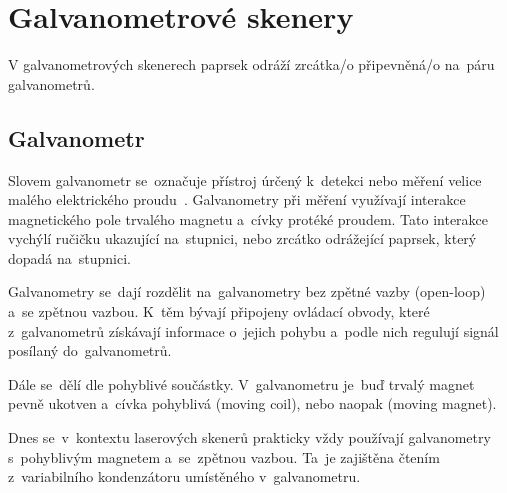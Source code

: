\section{Galvanometrové skenery}
V galvanometrových skenerech paprsek odráží zrcátka/o připevněná/o na~páru galvanometrů.

\subsection{Galvanometr}
Slovem galvanometr se~označuje přístroj úrčený k~detekci nebo měření velice malého elektrického proudu~\cite{galvo-definition}. Galvanometry při měření využívají interakce magnetického pole trvalého magnetu a~cívky protéké proudem. Tato interakce vychýlí ručičku ukazující na~stupnici, nebo zrcátko odrážející paprsek, který dopadá na~stupnici.~\cite{wiki-galvo}

Galvanometry se~dají rozdělit na~galvanometry bez zpětné vazby (open-loop) a~se zpětnou vazbou. K~těm bývají připojeny ovládací obvody, které z~galvanometrů získávají informace o~jejich pohybu a~podle nich regulují signál posílaný do~galvanometrů.~\cite{wiki-galvo}

Dále se~dělí dle pohyblivé součástky. V~galvanometru je~buď trvalý magnet pevně ukotven a~cívka pohyblivá (moving coil), nebo naopak (moving magnet). %

Dnes se~v~kontextu laserových skenerů prakticky vždy používají galvanometry s~pohyblivým magnetem a~se~zpětnou vazbou. Ta~je zajištěna čtením z~variabilního kondenzátoru umístěného v~galvanometru.

